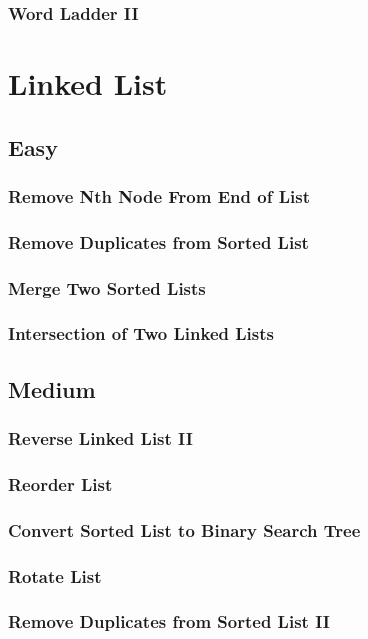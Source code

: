 \documentclass[11pt]{book}
\begin{document}
\subsection{Word Ladder II}
\label{sec-2-3-14}

\chapter{Linked List}
\label{sec-3}
\section{Easy}
\label{sec-3-1}
\subsection{Remove Nth Node From End of List}
\label{sec-3-1-1}
\subsection{Remove Duplicates from Sorted List}
\label{sec-3-1-2}
\subsection{Merge Two Sorted Lists}
\label{sec-3-1-3}
\subsection{Intersection of Two Linked Lists}
\label{sec-3-1-4}
\section{Medium}
\label{sec-3-2}
\subsection{Reverse Linked List II}
\label{sec-3-2-1}
\subsection{Reorder List}
\label{sec-3-2-2}
\subsection{Convert Sorted List to Binary Search Tree}
\label{sec-3-2-3}
\subsection{Rotate List}
\label{sec-3-2-4}
\subsection{Remove Duplicates from Sorted List II}
\label{sec-3-2-5}
\end{document}
